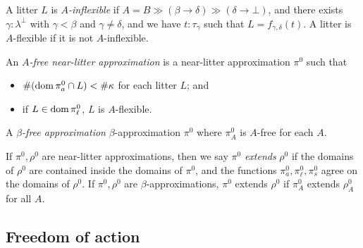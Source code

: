 \documentclass{article}
\begin{document}
\begin{definition}
    A litter \( L \) is \emph{\( A \)-inflexible} if \( A = B \gg (\beta \longrightarrow \delta) \gg (\delta \longrightarrow \bot) \), and there exists \( \gamma : \lambda^\bot \) with \( \gamma < \beta \) and \( \gamma \neq \delta \), and we have \( t : \tau_\gamma \) such that \( L = f_{\gamma,\delta}(t) \).
    A litter is \( A \)-flexible if it is not \( A \)-inflexible.
\end{definition}
\begin{definition}
    An \emph{\( A \)-free near-litter approximation} is a near-litter approximation \( \pi^0 \) such that
    \begin{itemize}
        \item \( \#(\operatorname{dom} \pi^0_a \cap L) < \#\kappa \) for each litter \( L \); and
        \item if \( L \in \operatorname{dom} \pi^0_\ell \), \( L \) is \( A \)-flexible.
    \end{itemize}
    A \emph{\( \beta \)-free approximation} \( \beta \)-approximation \( \pi^0 \) where \( \pi^0_A \) is \( A \)-free for each \( A \).
\end{definition}
\begin{definition}
    If \( \pi^0, \rho^0 \) are near-litter approximations, then we say \( \pi^0 \) \emph{extends} \( \rho^0 \) if the domains of \( \rho^0 \) are contained inside the domains of \( \pi^0 \), and the functions \( \pi^0_a, \pi^0_\ell, \pi^0_s \) agree on the domains of \( \rho^0 \).
    If \( \pi^0, \rho^0 \) are \( \beta \)-approximations, \( \pi^0 \) extends \( \rho^0 \) if \( \pi^0_A \) extends \( \rho^0_A \) for all \( A \).
\end{definition}

\subsection{Freedom of action}
\end{document}
